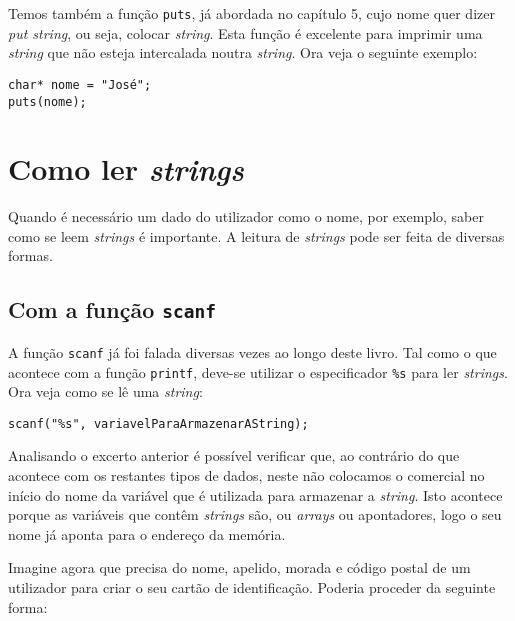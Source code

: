 Temos também a função \texttt{puts}, já abordada no capítulo 5, cujo nome quer dizer \textit{put string}, ou seja, colocar \textit{string}. Esta função é excelente para imprimir uma \textit{string} que não esteja intercalada noutra \textit{string}. Ora veja o seguinte exemplo:

\begin{lstlisting}
char* nome = "José";
puts(nome);
\end{lstlisting}

\section{Como ler \textit{strings}}

Quando é necessário um dado do utilizador como o nome, por exemplo, saber como se leem \textit{strings} é importante. A leitura de \textit{strings} pode ser feita de diversas formas.

\subsection{Com a função \texttt{scanf}}

A função \texttt{scanf} já foi falada diversas vezes ao longo deste livro. Tal como o que acontece com a função \texttt{printf}, deve-se utilizar o especificador \texttt{\%s} para ler \textit{strings}. Ora veja como se lê uma \textit{string}:

\begin{lstlisting}
scanf("%s", variavelParaArmazenarAString);
\end{lstlisting}

Analisando o excerto anterior é possível verificar que, ao contrário do que acontece com os restantes tipos de dados, neste não colocamos o  comercial no início do nome da variável que é utilizada para armazenar a \textit{string}. Isto acontece porque as variáveis que contêm \textit{strings} são, ou \textit{arrays} ou apontadores, logo o seu nome já aponta para o endereço da memória.

Imagine agora que precisa do nome, apelido, morada e código postal de um utilizador para criar o seu cartão de identificação. Poderia proceder da seguinte forma:

